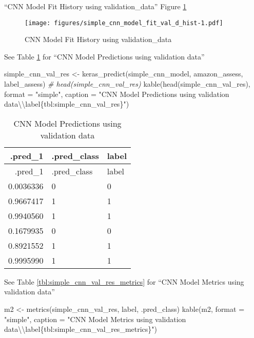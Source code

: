 \documentclass[
]{article}
\newenvironment{Shaded}{}{}
\newcommand{\AttributeTok}[1]{\textcolor[rgb]{0.49,0.56,0.16}{#1}}
\newcommand{\CommentTok}[1]{\textcolor[rgb]{0.38,0.63,0.69}{\textit{#1}}}
\newcommand{\FunctionTok}[1]{\textcolor[rgb]{0.02,0.16,0.49}{#1}}
\newcommand{\NormalTok}[1]{#1}
\newcommand{\OtherTok}[1]{\textcolor[rgb]{0.00,0.44,0.13}{#1}}
\newcommand{\SpecialCharTok}[1]{\textcolor[rgb]{0.25,0.44,0.63}{#1}}
\newcommand{\StringTok}[1]{\textcolor[rgb]{0.25,0.44,0.63}{#1}}
\begin{document}
``CNN Model Fit History using validation\_data'' Figure
\ref{fig:model_14}

\begin{figure}
\centering
\texttt{[image: figures/simple\_cnn\_model\_fit\_val\_d\_hist-1.pdf]}
\caption{CNN Model Fit History using
validation\_data\label{fig:model_14}}
\end{figure}

See Table \ref{tbl:simple_cnn_val_res} for ``CNN Model Predictions using
validation data''

\begin{Shaded}
\begin{Highlighting}[]
\NormalTok{simple\_cnn\_val\_res }\OtherTok{\textless{}{-}} \FunctionTok{keras\_predict}\NormalTok{(simple\_cnn\_model, amazon\_assess, label\_assess)}
\CommentTok{\# head(simple\_cnn\_val\_res)}
\FunctionTok{kable}\NormalTok{(}\FunctionTok{head}\NormalTok{(simple\_cnn\_val\_res), }\AttributeTok{format =} \StringTok{"simple"}\NormalTok{, }\AttributeTok{caption =} \StringTok{"CNN Model Predictions using validation data}\SpecialCharTok{\textbackslash{}\textbackslash{}}\StringTok{label\{tbl:simple\_cnn\_val\_res\}"}\NormalTok{)}
\end{Highlighting}
\end{Shaded}

\begin{longtable}[]{@{}rll@{}}
\caption{CNN Model Predictions using validation
data\label{tbl:simple_cnn_val_res}}\tabularnewline
\toprule
.pred\_1 & .pred\_class & label \\
\midrule
\endfirsthead
\toprule
.pred\_1 & .pred\_class & label \\
\midrule
\endhead
0.0036336 & 0 & 0 \\
0.9667417 & 1 & 1 \\
0.9940560 & 1 & 1 \\
0.1679935 & 0 & 0 \\
0.8921552 & 1 & 1 \\
0.9995990 & 1 & 1 \\
\bottomrule
\end{longtable}

See Table \ref{tbl:simple_cnn_val_res_metrics} for ``CNN Model Metrics
using validation data''

\begin{Shaded}
\begin{Highlighting}[]
\NormalTok{m2 }\OtherTok{\textless{}{-}} \FunctionTok{metrics}\NormalTok{(simple\_cnn\_val\_res, label, .pred\_class)}
\FunctionTok{kable}\NormalTok{(m2, }\AttributeTok{format =} \StringTok{"simple"}\NormalTok{, }\AttributeTok{caption =} \StringTok{"CNN Model Metrics using validation data}\SpecialCharTok{\textbackslash{}\textbackslash{}}\StringTok{label\{tbl:simple\_cnn\_val\_res\_metrics\}"}\NormalTok{)}
\end{Highlighting}
\end{Shaded}
\end{document}
